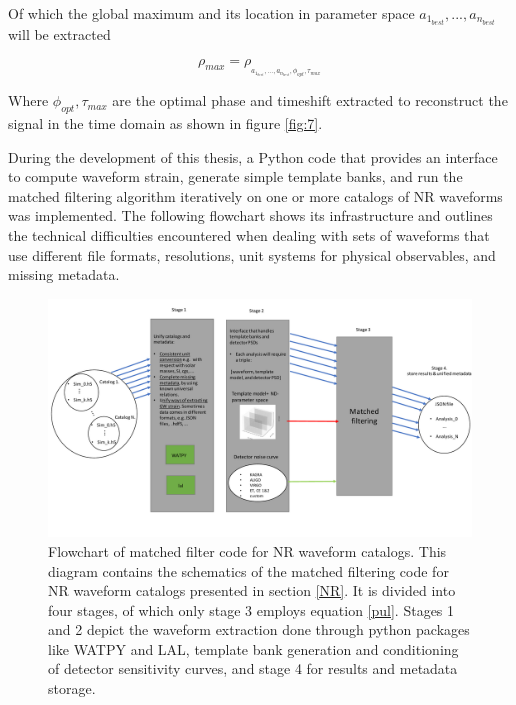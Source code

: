 Of which the global maximum and its location in parameter space $a_{1_{best}},...,a_{n_{best}}$ will be extracted 

\begin{equation}
\rho_{max} = \rho_{_{a_{1_{best}},...,a_{n_{best}},\phi_{opt},\tau_{max}}}
\end{equation}

Where $\phi_{opt},\tau_{max}$ are the optimal phase and timeshift extracted to reconstruct the signal in the time domain as shown in figure \ref{fig:7}. 

During the development of this thesis, a Python code that provides an interface to compute waveform strain, generate simple template banks, and run the matched filtering algorithm iteratively on one or more catalogs of NR waveforms was implemented. The following flowchart shows its infrastructure and outlines the technical difficulties encountered when dealing with sets of waveforms that use different file formats, resolutions, unit systems for physical observables, and missing metadata.


\newpage


\begin{figure}
\begin{center}
\includegraphics[width=\textwidth, angle=0]{images/cat_search.pdf}
\captionsetup{width=0.8\textwidth}
\caption[Flowchart of matched filter code for NR waveform catalogs]{Flowchart of matched filter code for NR waveform catalogs. This diagram contains the schematics of the matched filtering code for NR waveform catalogs presented in section \ref{NR}. It is divided into four stages, of which only stage 3 employs equation \ref{pul}. Stages 1 and 2 depict the waveform extraction done through python packages like WATPY and LAL, template bank generation and conditioning of detector sensitivity curves, and stage 4 for results and metadata storage.}
\label{fig:19}
\end{center}
\end{figure}

